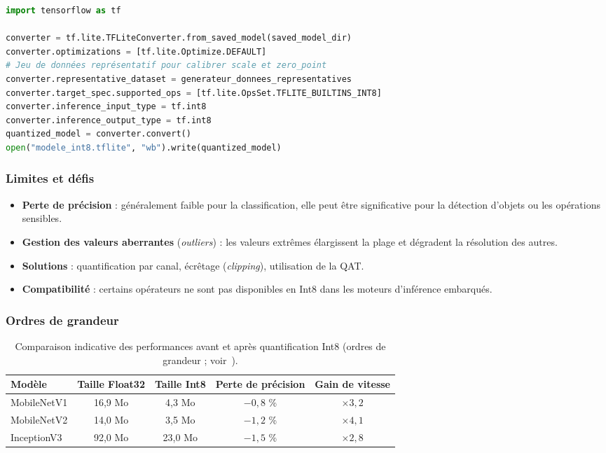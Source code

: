 \begin{lstlisting}[language=Python, caption={Quantification post-entraînement Int8 avec TensorFlow Lite.}, label={lst:ptq}]
import tensorflow as tf

converter = tf.lite.TFLiteConverter.from_saved_model(saved_model_dir)
converter.optimizations = [tf.lite.Optimize.DEFAULT]
# Jeu de données représentatif pour calibrer scale et zero_point
converter.representative_dataset = generateur_donnees_representatives
converter.target_spec.supported_ops = [tf.lite.OpsSet.TFLITE_BUILTINS_INT8]
converter.inference_input_type = tf.int8
converter.inference_output_type = tf.int8
quantized_model = converter.convert()
open("modele_int8.tflite", "wb").write(quantized_model)
\end{lstlisting}

\subsubsection{Limites et défis}
\begin{itemize}
  \item \textbf{Perte de précision} : généralement faible pour la
        classification, elle peut être significative pour la détection d'objets
        ou les opérations sensibles.
  \item \textbf{Gestion des valeurs aberrantes} (\emph{outliers}) : les valeurs
        extrêmes élargissent la plage et dégradent la résolution des autres.
  \item \textbf{Solutions} : quantification par canal, écrêtage
        (\emph{clipping}), utilisation de la QAT.
  \item \textbf{Compatibilité} : certains opérateurs ne sont pas disponibles en
        Int8 dans les moteurs d'inférence embarqués.
\end{itemize}

\subsubsection{Ordres de grandeur}

\begin{table}[H]
\centering
\small
\begin{tabular}{lcccc}
\toprule
Modèle & Taille Float32 & Taille Int8 & Perte de précision & Gain de vitesse \\
\midrule
MobileNetV1  & 16,9 Mo & 4,3 Mo  & $-0{,}8$ \% & $\times 3{,}2$ \\
MobileNetV2  & 14,0 Mo & 3,5 Mo  & $-1{,}2$ \% & $\times 4{,}1$ \\
InceptionV3  & 92,0 Mo & 23,0 Mo & $-1{,}5$ \% & $\times 2{,}8$ \\
\bottomrule
\end{tabular}
\caption{Comparaison indicative des performances avant et après quantification Int8 (ordres de grandeur ; voir~\cite{krishnamoorthi2018,jacob2018quantization}).}
\label{tab:bench-quant}
\end{table}

